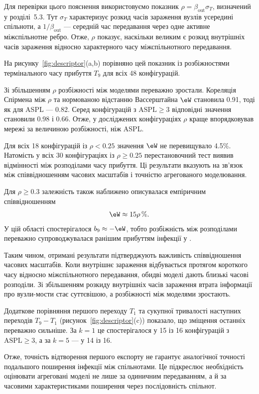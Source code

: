 Для перевірки цього пояснення
використовуємо показник
$\rho=\beta_{\mathrm{out}}\sigma_T$,
визначений у розділі~5.3.
Тут $\sigma_T$ характеризує
розкид часів зараження вузлів
усередині спільноти, а
$1/\beta_{\mathrm{out}}$ ---
середній час передавання через
одне активне міжспільнотне ребро.
Отже, $\rho$ показує, наскільки
великим є розкид внутрішніх
часів зараження відносно
характерного часу міжспільнотного
передавання.

На рисунку~\ref{fig:descriptor}(a,b)
порівняно цей показник із розбіжностями
термінального часу прибуття $T_9$
для всіх 48 конфігурацій.

Зі збільшенням $\rho$ розбіжності
між моделями переважно зростали.
Кореляція Спірмена між $\rho$
та нормованою відстанню Вассерштайна
$\eW$ становила 0.91, тоді як
для ASPL --- 0.82.
Серед конфігурацій з
$\mathrm{ASPL}\geq3$ відповідні
значення становили 0.98 і 0.66.
Отже, у досліджених конфігураціях
$\rho$ краще впорядковував мережі
за величиною розбіжності, ніж ASPL.

Для всіх 18 конфігурацій
із $\rho<0.25$ значення $\eW$
не перевищувало 4.5\%.
Натомість у всіх 30 конфігураціях
із $\rho\geq0.25$ перестановочний
тест виявив відмінності між
розподілами часу прибуття.
Ці результати вказують на
зв'язок між співвідношенням
часових масштабів і точністю
агрегованого моделювання.

Для $\rho\geq0.3$ залежність
також наближено описувалася
емпіричним співвідношенням
\begin{equation}
\eW \approx 15\rho\,\%.
\end{equation}
У цій області спостерігалося
$b_9\approx-\eW$, тобто
розбіжність між розподілами
переважно супроводжувалася
ранішим прибуттям інфекції
у \TS{}.

Таким чином, отримані результати
підтверджують важливість
співвідношення часових масштабів.
Коли внутрішнє зараження
відбувається протягом короткого
часу відносно міжспільнотного
передавання, обидві моделі
дають близькі часові розподіли.
Зі збільшенням розкиду
внутрішніх часів зараження
втрата інформації про вузли-мости
стає суттєвішою, а розбіжності
між моделями зростають.







Додаткове порівняння першого переходу
$T_1$ та сукупної тривалості наступних
переходів $T_9-T_1$
(рисунок~\ref{fig:descriptor}(c))
показало, що зміщення останніх
переважно сильніше.
За $k=1$ це спостерігалося
у 15 із 16 конфігурацій з
$\mathrm{ASPL}\geq3$, а за $k=5$
--- у 14 із 16.

Отже, точність відтворення першого
експорту не гарантує аналогічної
точності подальшого поширення
інфекції між спільнотами.
Це підкреслює необхідність
оцінювати агреговані моделі
не лише за одиничним передаванням,
а й за часовими характеристиками
поширення через послідовність
спільнот.




\clearpage

